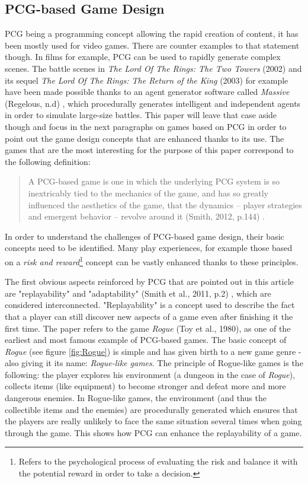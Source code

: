 \subsection{PCG-based Game Design}
PCG being a programming concept allowing the rapid creation of content, it has been mostly used for video games. There are counter examples to that statement though. In films for example, PCG can be used to rapidly generate complex scenes. The battle scenes in \textit{The Lord Of The Rings: The Two Towers} (2002) \cite{film:lotr2} and its sequel \textit{The Lord Of The Rings: The Return of the King} (2003) \cite{film:lotr3} for example have been made possible thanks to an agent generator software called \textit{Massive} (Regelous, n.d) \cite{soft:massive}, which procedurally generates intelligent and independent agents in order to simulate large-size battles. This paper will leave that case aside though and focus in the next paragraphs on games based on PCG in order to point out the game design concepts that are enhanced thanks to its use. The games that are the most interesting for the purpose of this paper correspond to the following definition:

\begin{quotation}
A PCG-based game is one in which the underlying PCG system is so inextricably tied to the mechanics of the game, and has so greatly influenced the aesthetics of the game, that the dynamics – player strategies and emergent behavior – revolve around it (Smith, 2012, p.144) \cite{pdf:smith}.
\end{quotation}

In order to understand the challenges of PCG-based game design, their basic concepts need to be identified. Many play experiences, for example those based on a \textit{risk and reward}\footnote{Refers to the psychological process of evaluating the risk and balance it with the potential reward in order to take a decision.} concept can be vastly enhanced thanks to these principles. 

The first obvious aspects reinforced by PCG that are pointed out in this article are "replayability" and "adaptability" (Smith et al., 2011, p.2) \cite{pdf:pcgbased}, which are considered interconnected. "Replayability" is a concept used to describe the fact that a player can still discover new aspects of a game even after finishing it the first time. The paper refers to the game \textit{Rogue} (Toy et al., 1980)\cite{game:rogue}, as one of the earliest and most famous example of PCG-based games. The basic concept of \textit{Rogue} (see figure \ref{fig:Rogue}) is simple and has given birth to a new game genre - also giving it its name: \textit{Rogue-like games}. The principle of Rogue-like games is the following: the player explores his environment (a dungeon in the case of \textit{Rogue}), collects items (like equipment) to become stronger and defeat more and more dangerous enemies. In Rogue-like games, the environment (and thus the collectible items and the enemies) are procedurally generated which ensures that the players are really unlikely to face the same situation several times when going through the game. This shows how PCG can enhance the replayability of a game.

